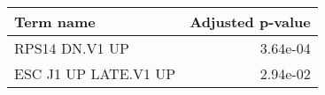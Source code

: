 \begin{tabular}{lr}
\toprule
           Term name &  Adjusted p-value \\
\midrule
      RPS14 DN.V1 UP &          3.64e-04 \\
ESC J1 UP LATE.V1 UP &          2.94e-02 \\
\bottomrule
\end{tabular}
